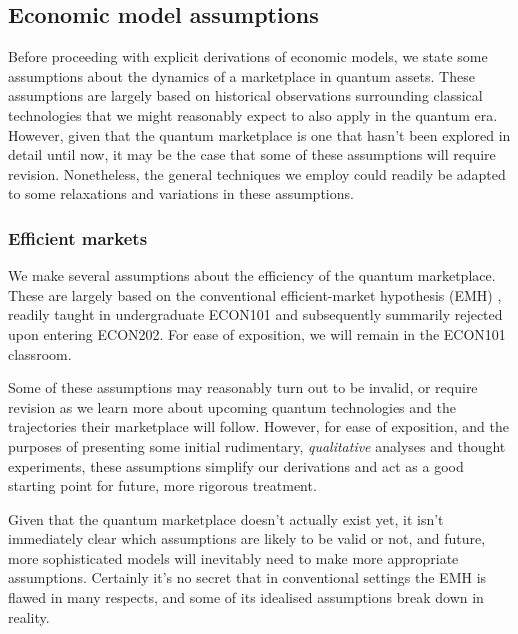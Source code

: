 %
%

\subsection{Economic model assumptions}

Before proceeding with explicit derivations of economic models, we state some assumptions about the dynamics of a marketplace in quantum assets. These assumptions are largely based on historical observations surrounding classical technologies that we might reasonably expect to also apply in the quantum era. However, given that the quantum marketplace is one that hasn't been explored in detail until now, it may be the case that some of these assumptions will require revision. Nonetheless, the general techniques we employ could readily be adapted to some relaxations and variations in these assumptions.

%

\subsubsection{Efficient markets}\label{sec:eff_markets} 

We make several assumptions about the efficiency of the quantum marketplace. These are largely based on the conventional efficient-market hypothesis (EMH) \cite{???}, readily taught in undergraduate ECON101 and subsequently summarily rejected upon entering ECON202. For ease of exposition, we will remain in the ECON101 classroom.

Some of these assumptions may reasonably turn out to be invalid, or require revision as we learn more about upcoming quantum technologies and the trajectories their marketplace will follow. However, for ease of exposition, and the purposes of presenting some initial rudimentary, \textit{qualitative} analyses and thought experiments, these assumptions simplify our derivations and act as a good starting point for future, more rigorous treatment.

Given that the quantum marketplace doesn't actually exist yet, it isn't immediately clear which assumptions are likely to be valid or not, and future, more sophisticated models will inevitably need to make more appropriate assumptions. Certainly it's no secret that in conventional settings the EMH is flawed in many respects, and some of its idealised assumptions break down in reality.

